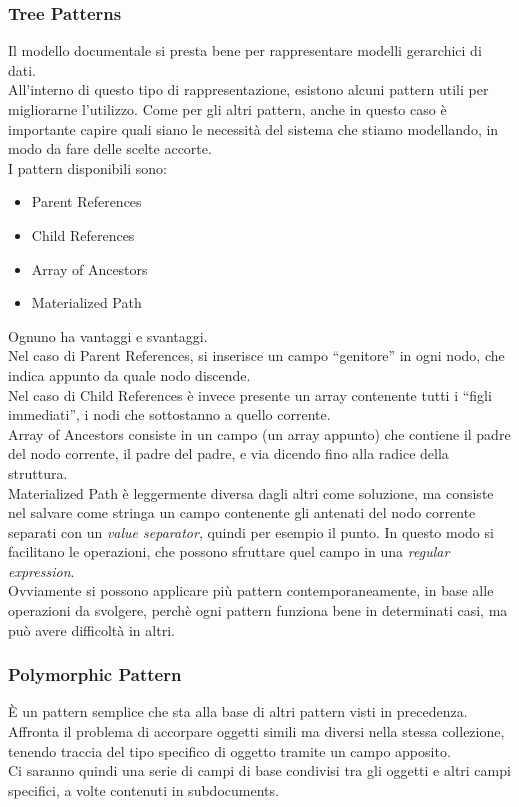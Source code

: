 \subsubsection{Tree Patterns}
Il modello documentale si presta bene per rappresentare modelli gerarchici di dati.\\
All'interno di questo tipo di rappresentazione, esistono alcuni pattern utili per migliorarne l'utilizzo. Come per gli altri pattern, anche in questo caso è importante capire quali siano le necessità del sistema che stiamo modellando, in modo da fare delle scelte accorte.\\
I pattern disponibili sono:
\begin{itemize}
    \item Parent References
    \item Child References
    \item Array of Ancestors
    \item Materialized Path
\end{itemize}
\noindent Ognuno ha vantaggi e svantaggi.\\
Nel caso di Parent References, si inserisce un campo ``genitore'' in ogni nodo, che indica appunto da quale nodo discende.\\
Nel caso di Child References è invece presente un array contenente tutti i ``figli immediati'', i nodi che sottostanno a quello corrente.\\
Array of Ancestors consiste in un campo (un array appunto) che contiene il padre del nodo corrente, il padre del padre, e via dicendo fino alla radice della struttura.\\
Materialized Path è leggermente diversa dagli altri come soluzione, ma consiste nel salvare come stringa un campo contenente gli antenati del nodo corrente separati con un \textit{value separator}, quindi per esempio il punto. In questo modo si facilitano le operazioni, che possono sfruttare quel campo in una \textit{regular expression}.\\
Ovviamente si possono applicare più pattern contemporaneamente, in base alle operazioni da svolgere, perchè ogni pattern funziona bene in determinati casi, ma può avere difficoltà in altri.\\

\subsubsection{Polymorphic Pattern}
È un pattern semplice che sta alla base di altri pattern visti in precedenza. Affronta il problema di accorpare oggetti simili ma diversi nella stessa collezione, tenendo traccia del tipo specifico di oggetto tramite un campo apposito.\\
Ci saranno quindi una serie di campi di base condivisi tra gli oggetti e altri campi specifici, a volte contenuti in subdocuments.\\

